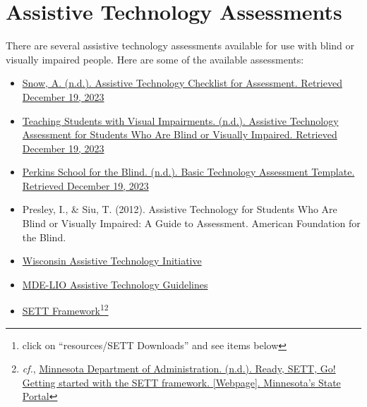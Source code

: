 \section{Assistive Technology Assessments}\label{trouble4}
There are several assistive technology assessments available for use with blind or visually impaired people. Here are some of the available assessments:
\begin{itemize}
 \item \href{https://www.teachingvisuallyimpaired.com/assistive-technology-assessment.html}{Snow, A. (n.d.). Assistive Technology Checklist for Assessment. Retrieved December 19, 2023}
 \item \href{http://www.teachingvisuallyimpaired.com/uploads/1/4/1/2/14122361/at\_assessment\_revised.pdf}{Teaching Students with Visual Impairments. (n.d.). Assistive Technology Assessment for Students Who Are Blind or Visually Impaired. Retrieved December 19, 2023}
 \item \href{https://www.perkins.org/sites/elearning.perkinsdev1.org/files/Basic\%20Technology\%20Assessment\%20Template\_0\_0.docx}{Perkins School for the Blind. (n.d.). Basic Technology Assessment Template. Retrieved December 19, 2023}
 \item Presley, I., \& Siu, T. (2012). Assistive Technology for Students Who Are Blind or Visually Impaired: A Guide to Assessment. American Foundation for the Blind.
 \item \href{https://www.wati.org/free-publications/assessing-students-needs-for-assistive-technology/}{Wisconsin Assistive Technology Initiative}
 \item \href{https://mdelio.org/blind-visually-impaired/educator-support/assistive-technology-guidelines}{MDE-LIO Assistive Technology Guidelines}
 \item \href{https://www.joyzabala.com/links-resources}{SETT Framework}\footnote{\raggedright click on ``resources/SETT Downloads'' and see items below}\footnote{\raggedright \emph{cf.}, \href{https://mn.gov/admin/at/getting-started/ready-sett-go.jsp}{Minnesota Department of Administration. (n.d.). Ready, SETT, Go! Getting started with the SETT framework. [Webpage]. Minnesota’s State Portal}}
\end{itemize}
